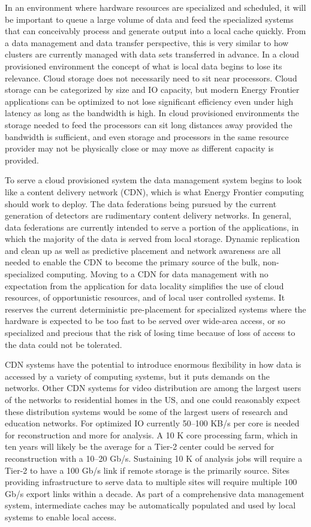 In an environment where hardware resources are specialized and
scheduled, it will be important to queue a large volume of data and
feed the specialized systems that can conceivably process and generate
output into a local cache quickly.  From a data management and data
transfer perspective, this is very similar to how clusters are
currently managed with data sets transferred in advance.  In a cloud
provisioned environment the concept of what is local data begins to
lose its relevance.  Cloud storage does not necessarily need to sit
near processors.  Cloud storage can be categorized by size and IO
capacity, but modern Energy Frontier applications can be optimized to
not lose significant efficiency even under high latency as long as the
bandwidth is high.  In cloud provisioned environments the storage
needed to feed the processors can sit long distances away provided the
bandwidth is sufficient, and even storage and processors in the same
resource provider may not be physically close or may move as different
capacity is provided.

To serve a cloud provisioned system the data management system begins
to look like a content delivery network (CDN), which is what Energy
Frontier computing should work to deploy.  The data federations being
pursued by the current generation of detectors are rudimentary content
delivery networks.  In general, data federations are currently intended
to serve a portion of the applications, in which the majority of the data
is served from local storage.  Dynamic replication and clean up as
well as predictive placement and network awareness are all needed to
enable the CDN to become the primary source of the bulk,
non-specialized computing.  Moving to a CDN for data management with
no expectation from the application for data locality simplifies the
use of cloud resources, of opportunistic resources, and of local user
controlled systems.  It reserves the current deterministic
pre-placement for specialized systems where the hardware is expected
to be too fast to be served over wide-area access, or so specialized
and precious that the risk of losing time because of loss of access to
the data could not be tolerated.

CDN systems have the potential to introduce enormous flexibility in
how data is accessed by a variety of computing systems, but it puts
demands on the networks.  Other CDN systems for video distribution are
among the largest users of the networks to residential homes in the
US, and one could reasonably expect these distribution systems would
be some of the largest users of research and education networks.  For
optimized IO currently 50--100 KB/s per core is needed for
reconstruction and more for analysis.  A 10 K core processing farm,
which in ten years will likely be the average for a Tier-2 center
could be served for reconstruction with a 10--20 Gb/s.  Sustaining 10 K
of analysis jobs will require a Tier-2 to have a 100 Gb/s link if
remote storage is the primarily source.  Sites providing
infrastructure to serve data to multiple sites will require multiple
100 Gb/s export links within a decade.  As part of a comprehensive data
management system, intermediate caches may be automatically populated
and used by local systems to enable local access.

